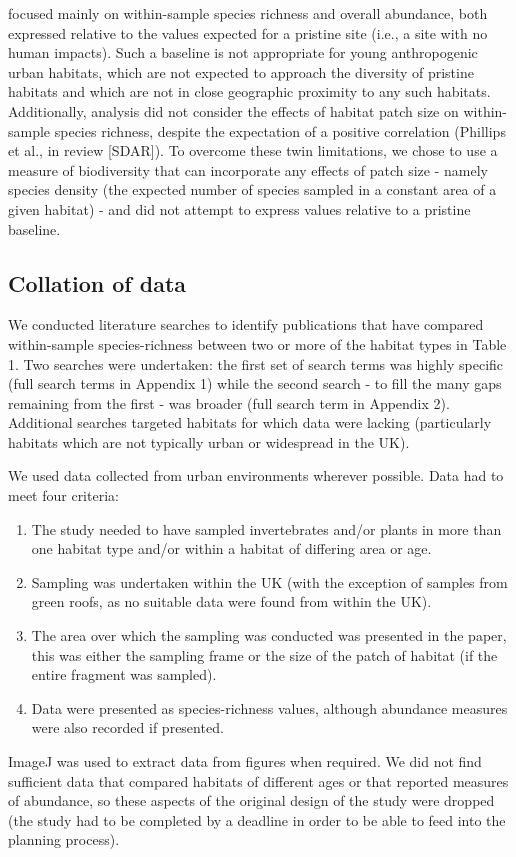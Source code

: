 \cite{Newbold:2015nat} focused mainly on within-sample species richness and overall abundance, both expressed relative to the values expected for a pristine site (i.e., a site with no human impacts). Such a baseline is not appropriate for young anthropogenic urban habitats, which are not expected to approach the diversity of pristine habitats and which are not in close geographic proximity to any such habitats. Additionally, \cite{Newbold:2015nat} analysis did not consider the effects of habitat patch size on within-sample species richness, despite the expectation of a positive correlation (Phillips et al., in review [SDAR]). To overcome these twin limitations, we chose to use a measure of biodiversity that can incorporate any effects of patch size - namely species density (the expected number of species sampled in a constant area of a given habitat) - and did not attempt to express values relative to a pristine baseline.

\subsection{Collation of data}
We conducted literature searches to identify publications that have compared within-sample species-richness between two or more of the habitat types in Table 1. Two searches were undertaken: the first set of search terms was highly specific (full search terms in Appendix 1) while the second search - to fill the many gaps remaining from the first - was broader (full search term in Appendix 2). Additional searches targeted habitats for which data were lacking (particularly habitats which are not typically urban or widespread in the UK).

We used data collected from urban environments wherever possible. Data had to meet four criteria:
\begin{enumerate}
\item The study needed to have sampled invertebrates and/or plants in more than one habitat type and/or within a habitat of differing area or age.
\item Sampling was undertaken within the UK (with the exception of samples from green roofs, as no suitable data were found from within the UK).
\item The area over which the sampling was conducted was presented in the paper, this was either the sampling frame or the size of the patch of habitat (if the entire fragment was sampled). 
\item Data were presented as species-richness values, although abundance measures were also recorded if presented.
\end{enumerate}
ImageJ \cite{schindelin:2012fiji} was used to extract data from figures when required. We did not find sufficient data that compared habitats of different ages or that reported measures of abundance, so these aspects of the original design of the study were dropped (the study had to be completed by a deadline in order to be able to feed into the planning process).

